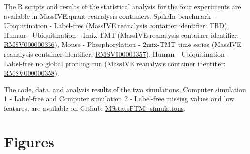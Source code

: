 \documentclass[mcp]{article}
\numberwithin{table}{section}
\begin{document}
The R scripts and results of the statistical analysis for the four experiments are available in MassIVE.quant reanalysis containers: SpikeIn benchmark - Ubiquitination - Label-free (MassIVE reanalysis container identifier: \href{https://massive.ucsd.edu/ProteoSAFe/private-dataset.jsp?task=c4c583ecf7f941cdac87f7a4f872517b}{TBD}), Human - Ubiquitination - 1mix-TMT (MassIVE reanalysis container identifier: \href{https://massive.ucsd.edu/ProteoSAFe/reanalysis_container.jsp?task=b639fa5d0ff24ce78abdca13f4b18c0a}{RMSV000000356}), Mouse - Phosphorylation - 2mix-TMT time series (MassIVE reanalysis container identifier: \href{https://massive.ucsd.edu/ProteoSAFe/reanalysis_container.jsp?task=79406d32c1f9413daf7756e6eeb24968}{RMSV000000357}), Human - Ubiquitination - Label-free no global profiling run (MassIVE reanalysis container identifier: \href{https://massive.ucsd.edu/ProteoSAFe/reanalysis_container.jsp?task=f9e6117e00794ce5b2e8802601be16bc}{RMSV000000358}).

The code, data, and analysis results of the two simulations, Computer simulation 1 - Label-free and Computer simulation 2 - Label-free missing values and low features, are available on Github: \href{https://github.com/devonjkohler/MSstatsPTM_simulations}{MSstatsPTM\_simulations}.


\newpage
\printbibliography


\newpage
\section{Figures}
\end{document}
